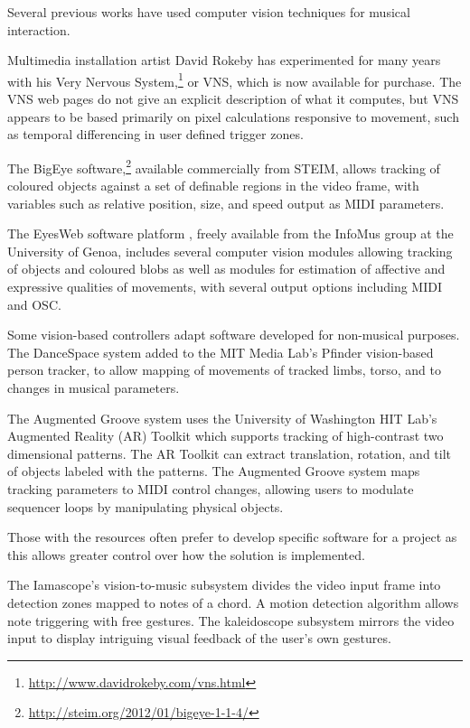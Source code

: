 Several previous works have used computer vision techniques for musical interaction. 

Multimedia installation artist David Rokeby has experimented for many years with his Very Nervous System,\footnote{\url{http://www.davidrokeby.com/vns.html}} or VNS, which is now available for purchase. The VNS web pages do not give an explicit description of what it computes, but VNS appears to be based primarily on pixel calculations responsive to movement, such as temporal differencing in user defined trigger zones. 

The BigEye software,\footnote{\url{http://steim.org/2012/01/bigeye-1-1-4/}} available commercially from STEIM, allows tracking of coloured objects against a set of definable regions in the video frame, with variables such as relative position, size, and speed output as MIDI parameters.

The EyesWeb software platform \cite{Camurri:2000b}, freely available from the InfoMus group at the University of Genoa, includes several computer vision modules allowing tracking of objects and coloured blobs as well as modules for estimation of affective and expressive qualities of movements, with several output options including MIDI and OSC.

Some vision-based controllers adapt software developed for non-musical purposes. The DanceSpace system \cite{Paradiso:1997d} added to the MIT Media Lab's Pfinder vision-based person tracker, to allow mapping of movements of tracked limbs, torso, and to changes in musical parameters.

The Augmented Groove system \cite{Poupyrev:2000} uses the University of Washington HIT Lab's Augmented Reality (AR) Toolkit which supports tracking of high-contrast two dimensional patterns. The AR Toolkit can extract translation, rotation, and tilt of objects labeled with the patterns. The Augmented Groove system maps tracking parameters to MIDI control changes, allowing users to modulate sequencer loops by manipulating physical objects.

Those with the resources often prefer to develop specific software for a project as this allows greater control over how the solution is implemented. 

The Iamascope's vision-to-music subsystem \cite{Fels:1999} divides the video input frame into detection zones mapped to notes of a chord. A motion detection algorithm allows note triggering with free gestures. The kaleidoscope subsystem mirrors the video input to display intriguing visual feedback of the user's own gestures. 

